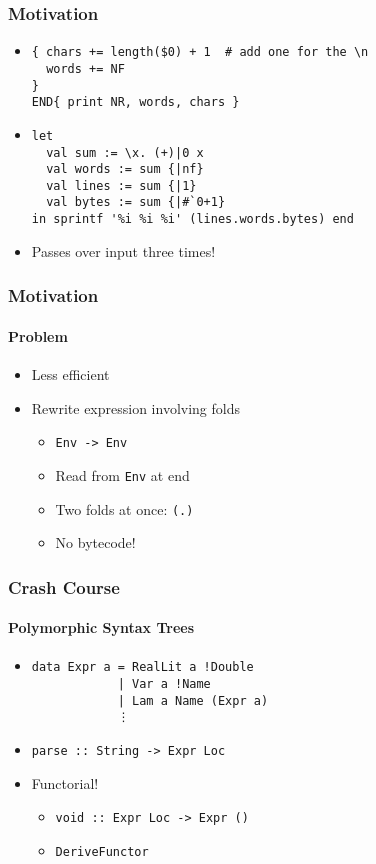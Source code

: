 \documentclass{beamer}
\begin{document}
\begin{frame}[fragile]
  \frametitle{Motivation}
  \begin{itemize}
    \item
      \begin{verbatim}
{ chars += length($0) + 1  # add one for the \n
  words += NF
}
END{ print NR, words, chars }
      \end{verbatim}
      \item
        \begin{verbatim}
let
  val sum := \x. (+)|0 x
  val words := sum {|nf}
  val lines := sum {|1}
  val bytes := sum {|#`0+1}
in sprintf '%i %i %i' (lines.words.bytes) end
        \end{verbatim}
      \item Passes over input three times!
  \end{itemize}
\end{frame}

\begin{frame}[fragile]
  \frametitle{Motivation}
  \framesubtitle{Problem}
  \begin{itemize}
    \item Less efficient
    \item Rewrite expression involving folds
      \begin{itemize}
        \item \verb|Env -> Env|
        \item Read from \verb|Env| at end
        \item Two folds at once: \verb|(.)|
        \item No bytecode!
      \end{itemize}
  \end{itemize}
\end{frame}

\begin{frame}[fragile]
  \frametitle{Crash Course}
  \framesubtitle{Polymorphic Syntax Trees}
    \begin{itemize}
      \item
      \begin{verbatim}
data Expr a = RealLit a !Double
            | Var a !Name
            | Lam a Name (Expr a)
            ⋮
\end{verbatim}
      \item \verb|parse :: String -> Expr Loc|
      \item Functorial!
        \begin{itemize}
          \item \verb|void :: Expr Loc -> Expr ()|
          \item \verb|DeriveFunctor|
        \end{itemize}
    \end{itemize}
\end{frame}
\end{document}

